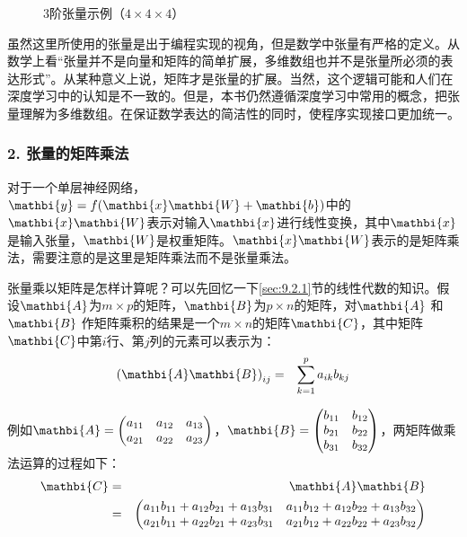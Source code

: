 \begin{figure}[htp]
\centering

\caption{3阶张量示例（$4 \times 4 \times 4$）}
\label{fig:9-25}
\end{figure}

\parinterval 虽然这里所使用的张量是出于编程实现的视角，但是数学中张量有严格的定义。从数学上看“张量并不是向量和矩阵的简单扩展，多维数组也并不是张量所必须的表达形式”。从某种意义上说，矩阵才是张量的扩展。当然，这个逻辑可能和人们在深度学习中的认知是不一致的。但是，本书仍然遵循深度学习中常用的概念，把张量理解为多维数组。在保证数学表达的简洁性的同时，使程序实现接口更加统一。


\subsubsection{2. 张量的矩阵乘法}

\parinterval 对于一个单层神经网络，$ {\mathbi{y}}=f({\mathbi{x}}{\mathbi{W}}+{\mathbi{b}}) $中的${\mathbi{x}}{\mathbi{W}} $表示对输入${\mathbi{x}} $进行线性变换，其中${\mathbi{x}}$是输入张量，$ {\mathbi{W}}$是权重矩阵。$ {\mathbi{x}} {\mathbi{W}} $表示的是矩阵乘法，需要注意的是这里是矩阵乘法而不是张量乘法。

\parinterval 张量乘以矩阵是怎样计算呢？可以先回忆一下\ref{sec:9.2.1}节的线性代数的知识。假设$ {\mathbi{A}} $为$ m\times p $的矩阵，$ {\mathbi{B}} $为$ p\times n $的矩阵，对${\mathbi{A}} $ 和${\mathbi{B}}$ 作矩阵乘积的结果是一个$ m\times n $的矩阵${\mathbi{C}}$，其中矩阵${\mathbi{C}}$中第$ i $行、第$ j $列的元素可以表示为：
\begin{eqnarray}
{({\mathbi{A}}{\mathbi{B}})}_{ij}&=&\sum_{k=1}^{p}{a_{ik}b_{kj}}
\label{eq:9-24}
\end{eqnarray}

\noindent 例如$ {\mathbi{A}}= \begin{pmatrix} a_{11} & a_{12} & a_{13}\\a_{21} & a_{22} & a_{23}\end{pmatrix} $，$ {\mathbi{B}}= \begin{pmatrix} b_{11} & b_{12}\\b_{21} & b_{22}\\b_{31} & b_{32}\end{pmatrix} $，两矩阵做乘法运算的过程如下：
\begin{eqnarray}
{\mathbi{C}} & = & {\mathbi{A}}{\mathbi{B}} \nonumber \\
                & = & \begin{pmatrix} a_{11}b_{11}+a_{12}b_{21}+a_{13}b_{31} & a_{11}b_{12}+a_{12}b_{22}+a_{13}b_{32}\\a_{21}b_{11}+a_{22}b_{21}+a_{23}b_{31} & a_{21}b_{12}+a_{22}b_{22}+a_{23}b_{32}\end{pmatrix}
\label{eq:9-108}
\end{eqnarray}

